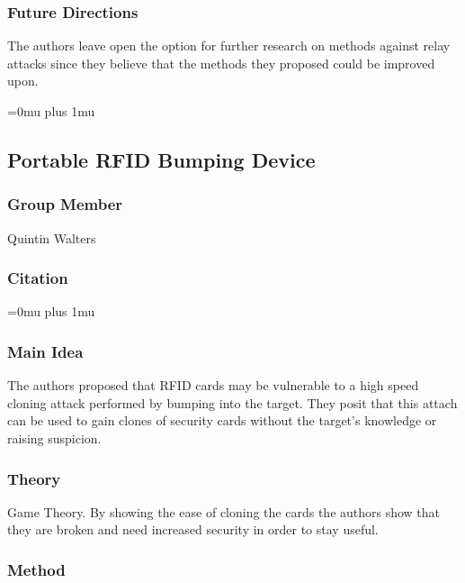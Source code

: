 \subsubsection{Future Directions}

\noindent
The authors leave open the option for further research on methods against relay attacks since they believe that the methods they proposed could be improved upon.

\Urlmuskip=0mu plus 1mu\relax

\noindent
\subsection{Portable RFID Bumping Device}

\subsubsection{Group Member}

\noindent
Quintin Walters

\noindent
\subsubsection{Citation}

\Urlmuskip=0mu plus 1mu\relax

\subsubsection{Main Idea}

\noindent
The authors proposed that RFID cards may be vulnerable to a high speed cloning attack performed by bumping into the target.  They posit that this attach can be used to gain clones of security cards without the target's knowledge or raising suspicion.

\subsubsection{Theory}

\noindent
Game Theory.  By showing the ease of cloning the cards the authors show that they are broken and need increased security in order to stay useful.

\subsubsection{Method}

